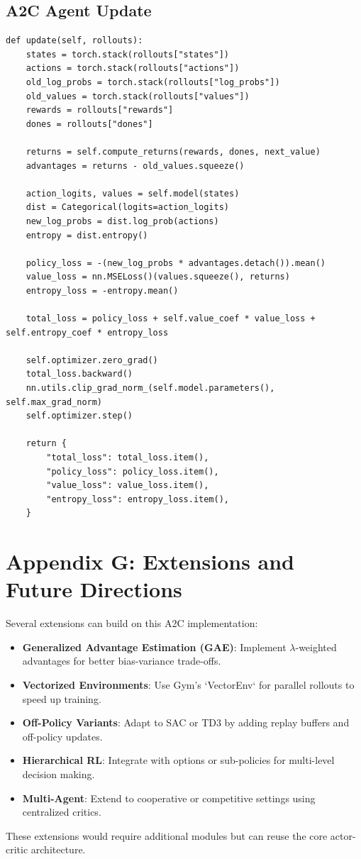 \documentclass[11pt]{article}
\begin{document}
\subsection{A2C Agent Update}
\begin{lstlisting}[caption=A2C agent update method]
def update(self, rollouts):
    states = torch.stack(rollouts["states"])
    actions = torch.stack(rollouts["actions"])
    old_log_probs = torch.stack(rollouts["log_probs"])
    old_values = torch.stack(rollouts["values"])
    rewards = rollouts["rewards"]
    dones = rollouts["dones"]

    returns = self.compute_returns(rewards, dones, next_value)
    advantages = returns - old_values.squeeze()

    action_logits, values = self.model(states)
    dist = Categorical(logits=action_logits)
    new_log_probs = dist.log_prob(actions)
    entropy = dist.entropy()

    policy_loss = -(new_log_probs * advantages.detach()).mean()
    value_loss = nn.MSELoss()(values.squeeze(), returns)
    entropy_loss = -entropy.mean()

    total_loss = policy_loss + self.value_coef * value_loss + self.entropy_coef * entropy_loss

    self.optimizer.zero_grad()
    total_loss.backward()
    nn.utils.clip_grad_norm_(self.model.parameters(), self.max_grad_norm)
    self.optimizer.step()

    return {
        "total_loss": total_loss.item(),
        "policy_loss": policy_loss.item(),
        "value_loss": value_loss.item(),
        "entropy_loss": entropy_loss.item(),
    }
\end{lstlisting}

\section{Appendix G: Extensions and Future Directions}
Several extensions can build on this A2C implementation:
\begin{itemize}
  \item \textbf{Generalized Advantage Estimation (GAE)}: Implement $\lambda$-weighted advantages for better bias-variance trade-offs.
  \item \textbf{Vectorized Environments}: Use Gym's `VectorEnv` for parallel rollouts to speed up training.
  \item \textbf{Off-Policy Variants}: Adapt to SAC or TD3 by adding replay buffers and off-policy updates.
  \item \textbf{Hierarchical RL}: Integrate with options or sub-policies for multi-level decision making.
  \item \textbf{Multi-Agent}: Extend to cooperative or competitive settings using centralized critics.
\end{itemize}
These extensions would require additional modules but can reuse the core actor-critic architecture.
\end{document}
